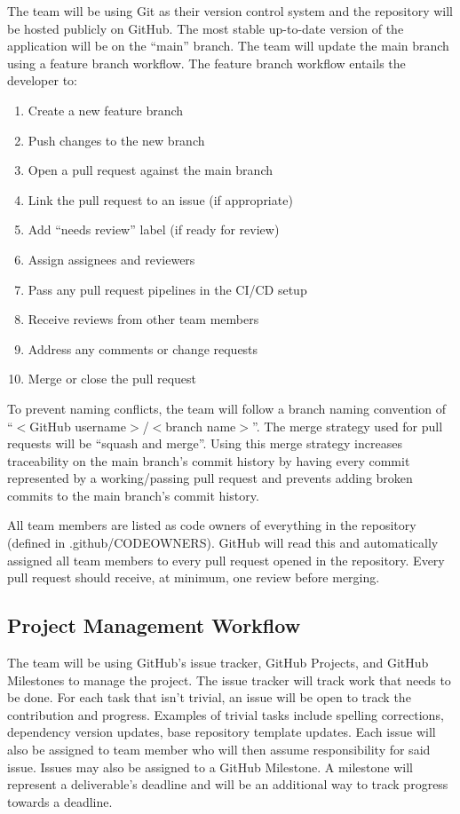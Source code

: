 \documentclass{article}
\begin{document}
The team will be using Git as their version control system and the repository will be hosted
publicly on GitHub. The most stable up-to-date version of the application will be on the ``main''
branch. The team will update the main branch using a feature branch workflow. The feature branch
workflow entails the developer to:

\begin{enumerate}
  \item Create a new feature branch
  \item Push changes to the new branch
  \item Open a pull request against the main branch
  \item Link the pull request to an issue (if appropriate)
  \item Add ``needs review'' label (if ready for review)
  \item Assign assignees and reviewers
  \item Pass any pull request pipelines in the CI/CD setup
  \item Receive reviews from other team members
  \item Address any comments or change requests
  \item Merge or close the pull request
\end{enumerate}

To prevent naming conflicts, the team will follow a branch naming convention of
``$<$GitHub username$>$/$<$branch name$>$''. The merge strategy used for pull requests will be
``squash and merge''. Using this merge strategy increases traceability on the main branch's commit
history by having every commit represented by a working/passing pull request and prevents adding
broken commits to the main branch's commit history.

All team members are listed as code owners of everything in the repository (defined in
.github/CODEOWNERS). GitHub will read this and automatically assigned all team members to every pull
request opened in the repository. Every pull request should receive, at minimum, one review before
merging.

\subsection{Project Management Workflow}

The team will be using GitHub's issue tracker, GitHub Projects, and GitHub Milestones to manage the
project. The issue tracker will track work that needs to be done. For each task that isn't trivial,
an issue will be open to track the contribution and progress. Examples of trivial tasks include
spelling corrections, dependency version updates, base repository template updates. Each issue will
also be assigned to team member who will then assume responsibility for said issue. Issues may also
be assigned to a GitHub Milestone. A milestone will represent a deliverable's deadline and will be
an additional way to track progress towards a deadline.
\end{document}
